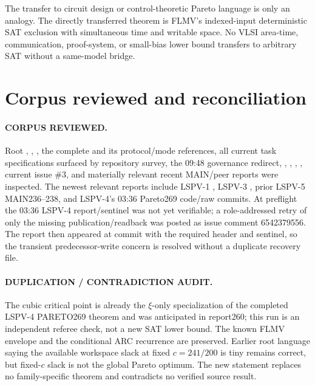 \documentclass[11pt]{article}
\begin{document}
The transfer to circuit design or control-theoretic Pareto language is only an
analogy.  The directly transferred theorem is FLMV's indexed-input deterministic
SAT exclusion with simultaneous time and writable space.  No VLSI area-time,
communication, proof-system, or small-bias lower bound transfers to arbitrary
SAT without a same-model bridge.

\section{Corpus reviewed and reconciliation}
\paragraph{CORPUS REVIEWED.}
Root , , , the complete
 and its protocol/mode references,
all current task specifications surfaced by repository survey, the 09:48
governance redirect, ,
, ,
, current issue \#3, and materially relevant recent
MAIN/peer reports were inspected.  The newest relevant reports include LSPV-1
, LSPV-3
, prior LSPV-5
MAIN236--238, and LSPV-4's 03:36 Pareto269 code/raw commits.  At preflight the
03:36 LSPV-4 report/sentinel was not yet verifiable; a role-addressed retry of
only the missing publication/readback was posted as issue comment 6542379556.
The report then appeared at commit
 with the required header and
sentinel, so the transient predecessor-write concern is resolved without a
duplicate recovery file.

\paragraph{DUPLICATION / CONTRADICTION AUDIT.}
The cubic critical point is already the $\xi$-only specialization of the
completed LSPV-4 PARETO269 theorem and was anticipated in report260; this run is
an independent referee check, not a new SAT lower bound.  The known FLMV
envelope and the conditional ARC recurrence are preserved.  Earlier root
language saying the available
workspace slack at fixed $c=241/200$ is tiny remains correct, but fixed-$c$
slack is not the global Pareto optimum.  The new statement replaces no
family-specific theorem and contradicts no verified source result.
\end{document}
